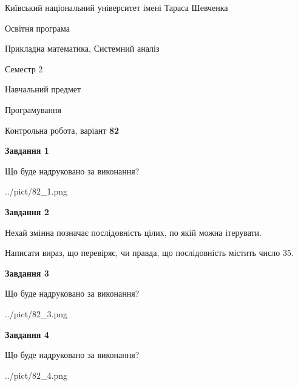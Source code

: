 \documentclass[12pt, ukrainian]{article}
\begin{document}
{{\begin {small}\par
{ \center  Київський національний університет імені Тараса Шевченка \par}
{\parbox {5 cm}{Освітня програма \hfill}{\parbox {8 cm}{Прикладна математика, Системний аналіз \hfill}}\parbox {5 cm}{\hfill Семестр 2}}\par
{\parbox {5 cm} {Навчальний предмет \hfill}\parbox {7 cm}{Програмування \hfill}\parbox {6cm}{\hfill}\par}\vspace{-7pt} \end{small}}{\center Контрольна робота, варіант  \No \textbf
{ 82 }\par}}
{
\begin {large}
{\begin {center}\textbf{Завдання 1}\end {center}}\par
Що буде надруковано за виконання?\par\par
\begin{center}
	{../pict/82_1.png}
\end{center}
\newpage

{\begin {center}\textbf{Завдання 2}\end {center}}\par
Нехай змінна  позначає послідовність цілих, по якій можна ітерувати.

Написати вираз, що перевіряє, чи правда, що послідовність  містить число 35.\par
\newpage

{\begin {center}\textbf{Завдання 3}\end {center}}\par
Що буде надруковано за виконання?
\begin{center}
	{../pict/82_3.png}
\end{center}
\newpage

{\begin {center}\textbf{Завдання 4}\end {center}}\par
Що буде надруковано за виконання?\par
\begin{center}
	{../pict/82_4.png}
\end{center}
\newpage


\end{large}}
\end{document}
